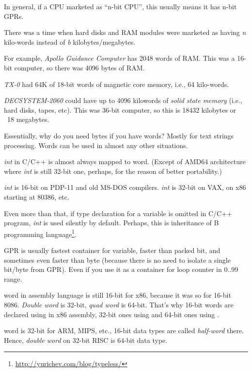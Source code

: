 In general, if a CPU marketed as ``n-bit CPU'', this usually means it has n-bit \ac{GPR}s.

There was a time when hard disks and \ac{RAM} modules were marketed as having \emph{n} kilo-words instead of
\emph{b} kilobytes/megabytes.

For example, \emph{Apollo Guidance Computer}
has 2048 words of \ac{RAM}.
This was a 16-bit computer, so there was 4096 bytes of \ac{RAM}.

\emph{TX-0} had 64K of 18-bit words of magnetic core memory,
i.e., 64 kilo-words.

\emph{DECSYSTEM-2060}
could have up to 4096 kilowords of \emph{solid state memory}
(i.e., hard disks, tapes, etc).
This was 36-bit computer, so this is 18432 kilobytes or ~18 megabytes.

Essentially, why do you need bytes if you have words?
Mostly for text strings processing.
Words can be used in almost any other situations.

\myhrule{}

\emph{int} in C/C++ is almost always mapped to \gls{word}.
(Except of AMD64 architecture where \emph{int} is still 32-bit one, perhaps, for the reason of better portability.)

\emph{int} is 16-bit on PDP-11 and old MS-DOS compilers.
\emph{int} is 32-bit on VAX, on x86 starting at 80386, etc.

Even more than that, if type declaration for a variable is omitted in C/C++ program, \emph{int} is used silently by default.
Perhaps, this is inheritance of B programming language\footnote{\url{http://yurichev.com/blog/typeless/}}.

\myhrule{}

\ac{GPR} is usually fastest container for variable, faster than packed bit,
and sometimes even faster than byte (because there is no need to isolate a single bit/byte from \ac{GPR}).
Even if you use it as a container for loop counter in 0..99 range.

\myhrule{}

\Gls{word} in assembly language is still 16-bit for x86, because it was so for 16-bit 8086.
\emph{Double word} is 32-bit, \emph{quad word} is 64-bit.
That's why 16-bit words are declared using  in x86 assembly, 32-bit ones using  and 64-bit ones using .

\Gls{word} is 32-bit for ARM, MIPS, etc., 16-bit data types are called \emph{half-word} there.
Hence, \emph{double word} on 32-bit RISC is 64-bit data type.

